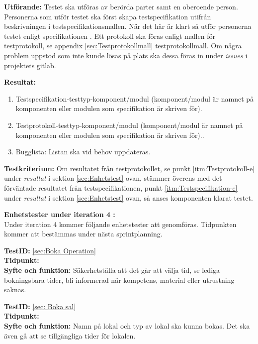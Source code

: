 \documentclass[a4paper,10pt, twoside]{article}
\begin{document}
  \textbf{Utförande:} Testet ska utföras av berörda parter samt en oberoende person. Personerna som 		utför testet ska först skapa testspecifikation utifrån beskrivningen i testspecifikationsmallen. 		När det här är klart så utför personerna testet enligt specifikationen \cite{kravspec}. Ett 			protokoll ska föras enligt mallen för testprotokoll, se appendix \ref{sec:Testprotokollmall} 			testprotokollmall. Om några problem uppstod som inte kunde lösas på plats ska dessa föras in under \emph{issues} i projektets gitlab.

  \textbf{Resultat:}
    \begin{enumerate}
      \item \label{itm:Testspecifikation-e} Testspecifikation-testtyp-komponent/modul (komponent/modul 			är namnet på komponenten eller modulen som specifikation är skriven för).
      \item \label{itm:Testprotokoll-e} Testprotokoll-testtyp-komponent/modul (komponent/modul är 					namnet på komponenten eller modulen som specifikation
       är skriven för)..
      \item Bugglista: Listan ska vid behov uppdateras.
    \end{enumerate}

   \textbf{Testkriterium:} Om resultatet från testprotokollet, se punkt \ref{itm:Testprotokoll-e} under      	\emph{resultat} i sektion \ref{sec:Enhetstest}
   ovan, stämmer överens med det förväntade resultatet från testspecifikationen, punkt \ref{itm:Testspecifikation-e} under \emph{resultat} i sektion
  \ref{sec:Enhetstest} ovan, så anses komponenten klarat testet.

  \textbf{Enhetstester under iteration 4 :}
  \\  Under iteration 4 kommer följande enhetstester att genomföras. Tidpunkten kommer att bestämmas 
  under nästa sprintplanning.

  \textbf{TestID:} \ref{sec:Boka Operation}
  \\ \textbf{Tidpunkt:}
  \\ \textbf{Syfte och funktion:} Säkerhetställa att det går att välja tid, se lediga bokningsbara 			 tider, bli informerad när kompetens, material eller utrustning saknas.
  

  \textbf{TestID:} \ref{sec: Boka sal}
  \\ \textbf{Tidpunkt:}
  \\ \textbf{Syfte och funktion:} Namn på lokal och typ av lokal ska kunna bokas. Det ska även gå att se tillgängliga tider för lokalen.
\end{document}
